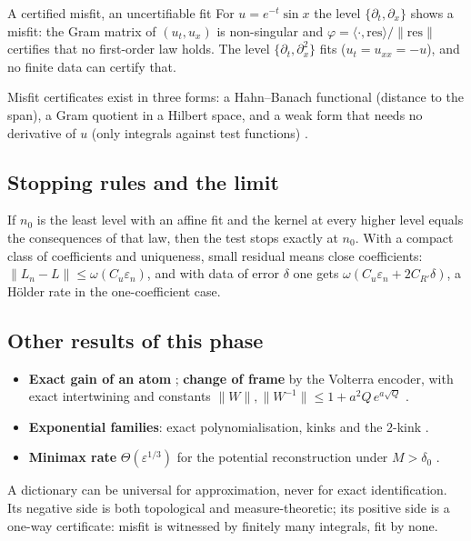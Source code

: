 \begin{example}{A certified misfit, an uncertifiable fit}
For $u=e^{-t}\sin x$ the level $\{\partial_t,\partial_x\}$ shows a misfit: the Gram matrix of $(u_t,u_x)$ is non-singular and $\varphi=\langle\cdot,\mathrm{res}\rangle/\|\mathrm{res}\|$ certifies that no first-order law holds. The level $\{\partial_t,\partial_x^2\}$ fits ($u_t=u_{xx}=-u$), and no finite data can certify that.
\end{example}

Misfit certificates exist in three forms: a Hahn--Banach functional (distance to the span), a Gram quotient in a Hilbert space, and a weak form that needs no derivative of $u$ (only integrals against test functions) .

\subsection{Stopping rules and the limit}

\begin{theorem}\label{thm:dictgr}
If $n_0$ is the least level with an affine fit and the kernel at every higher level equals the consequences of that law, then the test stops exactly at $n_0$. With a compact class of coefficients and uniqueness, small residual means close coefficients: $\|L_n-L\|\le\omega(C_u\varepsilon_n)$, and with data of error $\delta$ one gets $\omega(C_u\varepsilon_n+2C_{R'}\delta)$, a H\"older rate in the one-coefficient case.
\end{theorem}

\subsection{Other results of this phase}

\begin{itemize}
\item \textbf{Exact gain of an atom} ; \textbf{change of frame} by the Volterra encoder, with exact intertwining and constants $\|W\|,\|W^{-1}\|\le1+a^2Q\,e^{a\sqrt Q}$ .
\item \textbf{Exponential families}: exact polynomialisation, kinks and the $2$-kink .
\item \textbf{Minimax rate} $\Theta(\varepsilon^{1/3})$ for the potential reconstruction under $M>\delta_0$ .
\end{itemize}

\begin{takeaway}
A dictionary can be universal for approximation, never for exact identification. Its negative side is both topological and measure-theoretic; its positive side is a one-way certificate: misfit is witnessed by finitely many integrals, fit by none.
\end{takeaway}
